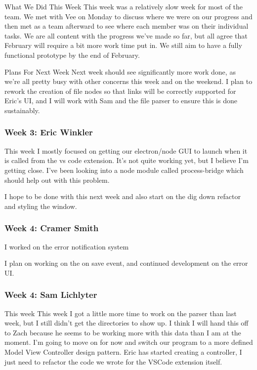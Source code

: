 What We Did This Week
This week was a relatively slow week for most of the team. We met with Vee on Monday to discuss where we were on our progress and then met as a team afterward to see where each member was on their individual tasks. We are all content with the progress we've made so far, but all agree that February will require a bit more work time put in. We still aim to have a fully functional prototype by the end of February.

Plans For Next Week
Next week should see significantly more work done, as we're all pretty busy with other concerns this week and on the weekend. I plan to rework the creation of file nodes so that links will be correctly supported for Eric's UI, and I will work with Sam and the file parser to ensure this is done sustainably.

\subsubsection{Week 3: Eric Winkler}

This week I mostly focused on getting our electron/node GUI to launch when it is called from the vs code extension. It's not quite working yet, but I believe I'm getting close. I've been looking into a node module called process-bridge which should help out with this problem.

I hope to be done with this next week and also start on the dig down refactor and styling the window.

\subsubsection{Week 4: Cramer Smith}

I worked on the error notification system

I plan on working on the on save event, and continued development on the error UI.

\subsubsection{Week 4: Sam Lichlyter}

This week
This week I got a little more time to work on the parser than last week, but I still didn't get the directories to show up. I think I will hand this off to Zach because he seems to be working more with this data than I am at the moment. I'm going to move on for now and switch our program to a more defined Model View Controller design pattern. Eric has started creating a controller, I just need to refactor the code we wrote for the VSCode extension itself. 

